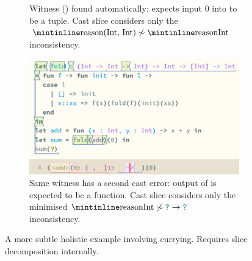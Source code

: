 \begin{figure}[h]
\begin{subfigure}{0.49\textwidth}
\caption{Witness (\code{[0]}) found automatically: expects input $0$ into  to be a tuple. Cast slice considers only the $\code{(Int, Int)} \not\sim \code{Int}$ inconsistency.}
\end{subfigure}
\begin{subfigure}{0.49\textwidth}
\includegraphics[width=1\textwidth]{Media/Figures/curries_expects_function}
\caption{Same witness has a second cast error: output of  is expected to be a function. Cast slice considers only the minimised $\code{Int} \not\sim {\dyn \to \dyn}$ inconsistency.}
\end{subfigure}
\caption{A more subtle holistic example involving currying. Requires slice decomposition internally.}
\label{fig:TastyCurry}
\end{figure}